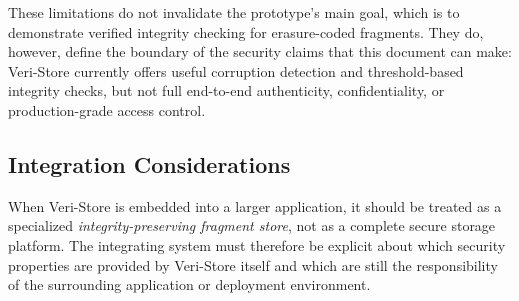 \documentclass[../veristore_security_model.tex]{subfiles}
\begin{document}
These limitations do not invalidate the prototype's main goal, which is to demonstrate verified integrity checking for erasure-coded fragments. They do, however, define the boundary of the security claims that this document can make: Veri-Store currently offers useful corruption detection and threshold-based integrity checks, but not full end-to-end authenticity, confidentiality, or production-grade access control.

\subsection{Integration Considerations}

When Veri-Store is embedded into a larger application, it should be treated as a specialized \emph{integrity-preserving fragment store}, not as a complete secure storage platform. The integrating system must therefore be explicit about which security properties are provided by Veri-Store itself and which are still the responsibility of the surrounding application or deployment environment.
\end{document}
